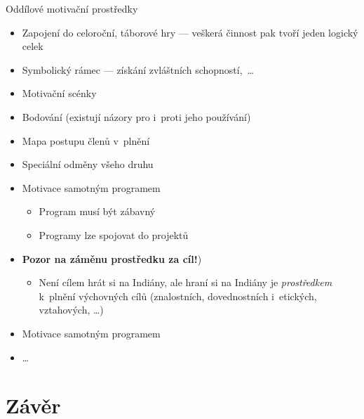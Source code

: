 \documentclass[hyperref={bookmarks=true, unicode=true, colorlinks=true, plainpages=false, pdfkeywords={Skaut, Junak, Skauting, Vychovna metoda}, linkcolor=OrangeRed, anchorcolor=OrangeRed, citecolor=RawSienna, filecolor=RawSienna, menucolor=OrangeRed, urlcolor=RawSienna, pdftex}, compress, xelatex, xcolor=dvipsnames, print]{beamer}
\begin{document}
\begin{frame}{Oddílové motivační prostředky}
\begin{itemize}
\item Zapojení do celoroční, táborové hry --- veškerá činnost pak tvoří jeden logický celek
\item Symbolický rámec --- získání zvláštních schopností,~\ldots
\item Motivační scénky
\item Bodování (existují názory pro i~proti jeho používání)
\item Mapa postupu členů v~plnění
\item Speciální odměny všeho druhu
\item Motivace samotným programem
 \begin{itemize}
 \item Program musí být zábavný
 \item Programy lze spojovat do projektů
 \end{itemize}
\item \textbf{Pozor na záměnu prostředku za cíl!})
 \begin{itemize}
 \item Není cílem hrát si na Indiány, ale hraní si na Indiány je \textit{prostředkem} k~plnění výchovných cílů (znalostních, dovednostních i~etických, vztahových, \ldots)
 \end{itemize}
\item Motivace samotným programem
\item \ldots
\end{itemize}
\end{frame}

\section{Závěr}
\end{document}
